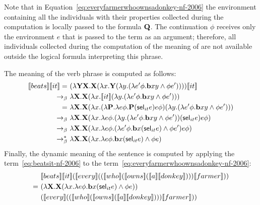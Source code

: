 \begin{example}
Note that in Equation~\eqref{eq:everyfarmerwhoownsadonkey-nf-2006} the environment containing all the individuals with their properties collected during the computation is locally passed to the formula $\Q2$. The continuation $\phi$ receives only the environment $e$ that is passed to the term as an argument; therefore, all individuals collected during the computation of the meaning of  are not available outside the logical formula interpreting this phrase.

The meaning of the verb phrase  is computed as follows:
\begin{align}
 \trr{\I{beats}}  \trr{\I{it}}  
 = \ &  (\lambda \Y2 \X2. \X2 ( \lambda \x1. \Y2 (\lambda \y1. ( \lambda e' \phi. \cbeat \x1 \y1 \land \phi e')))) \trr{\I{it}}   \notag \\
 \bconv \ & \lambda  \X2. \X2 ( \lambda \x1. \trr{\I{it}}  (\lambda \y1. ( \lambda e' \phi. \cbeat \x1 \y1 \land \phi e')))   \notag \\
 = \ & \lambda  \X2. \X2 ( \lambda \x1. (  \lambda \P2. \lambda e \phi. \P2 ( \sel_{it} e) e \phi )  (\lambda \y1. ( \lambda e' \phi. \cbeat \x1 \y1 \land \phi e')))   \notag \\
 \bconv \ & \lambda  \X2. \X2 ( \lambda \x1. \lambda e \phi. (\lambda \y1. ( \lambda e' \phi. \cbeat \x1 \y1 \land \phi e')) ( \sel_{it} e) e \phi )    \notag \\
 \bconv \ &  \lambda  \X2. \X2 ( \lambda \x1. \lambda e \phi.  ( \lambda e' \phi. \cbeat \x1  ( \sel_{it} e)  \land \phi e') e \phi )    \notag \\
  \bred \ &  \lambda  \X2. \X2 ( \lambda \x1. \lambda e \phi.   \cbeat \x1  ( \sel_{it} e)  \land \phi e )  \label{eq:beatsit-nf-2006}
\end{align}
Finally, the dynamic meaning of the sentence is computed by applying the \\ term~\eqref{eq:beatsit-nf-2006} to the term~\eqref{eq:everyfarmerwhoownsadonkey-nf-2006}:
\begin{align}
& \trr{\I{beats}}  \trr{\I{it}} (\trr{\I{every}}  ((\trr{\I{who}}  (\trr{\I{owns}}  (\trr{\I{a}}  \trr{\I{donkey}} ) ) ) \trr{\I{farmer}}  )) \notag \\
= \ & ( \lambda  \X2. \X2 ( \lambda \x1. \lambda e \phi.   \cbeat \x1  ( \sel_{it} e)  \land \phi e )) \notag \\
&  (\trr{\I{every}}  ((\trr{\I{who}}  (\trr{\I{owns}}  (\trr{\I{a}}  \trr{\I{donkey}} ) ) ) \trr{\I{farmer}}  )) \notag \\

\end{align}
\end{example}
